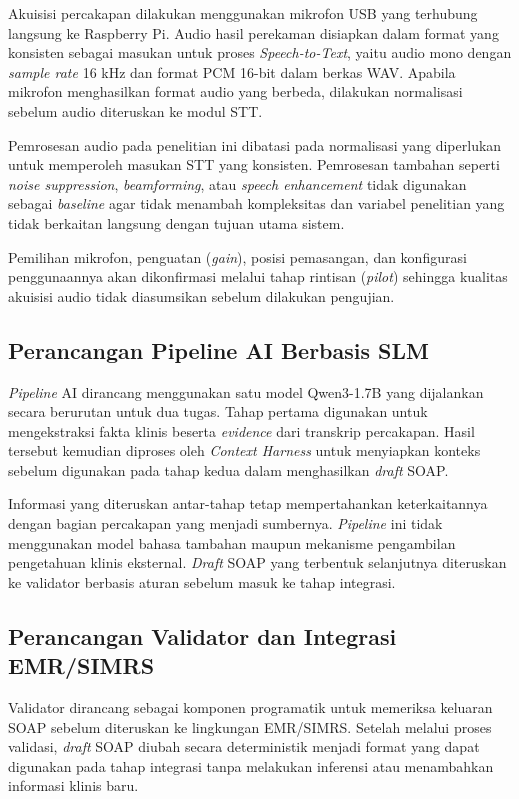 Akuisisi percakapan dilakukan menggunakan mikrofon USB yang terhubung langsung ke Raspberry Pi. Audio hasil perekaman disiapkan dalam format yang konsisten sebagai masukan untuk proses \emph{Speech-to-Text}, yaitu audio mono dengan \emph{sample rate} 16 kHz dan format PCM 16-bit dalam berkas WAV. Apabila mikrofon menghasilkan format audio yang berbeda, dilakukan normalisasi sebelum audio diteruskan ke modul STT.

Pemrosesan audio pada penelitian ini dibatasi pada normalisasi yang diperlukan untuk memperoleh masukan STT yang konsisten. Pemrosesan tambahan seperti \emph{noise suppression}, \emph{beamforming}, atau \emph{speech enhancement} tidak digunakan sebagai \emph{baseline} agar tidak menambah kompleksitas dan variabel penelitian yang tidak berkaitan langsung dengan tujuan utama sistem.

Pemilihan mikrofon, penguatan (\emph{gain}), posisi pemasangan, dan konfigurasi penggunaannya akan dikonfirmasi melalui tahap rintisan (\emph{pilot}) sehingga kualitas akuisisi audio tidak diasumsikan sebelum dilakukan pengujian.

\subsection{Perancangan Pipeline AI Berbasis SLM}
\label{subsec:pipelineai}

\emph{Pipeline} AI dirancang menggunakan satu model Qwen3-1.7B yang dijalankan secara berurutan untuk dua tugas. Tahap pertama digunakan untuk mengekstraksi fakta klinis beserta \emph{evidence} dari transkrip percakapan. Hasil tersebut kemudian diproses oleh \emph{Context Harness} untuk menyiapkan konteks sebelum digunakan pada tahap kedua dalam menghasilkan \emph{draft} SOAP.

Informasi yang diteruskan antar-tahap tetap mempertahankan keterkaitannya dengan bagian percakapan yang menjadi sumbernya. \emph{Pipeline} ini tidak menggunakan model bahasa tambahan maupun mekanisme pengambilan pengetahuan klinis eksternal. \emph{Draft} SOAP yang terbentuk selanjutnya diteruskan ke validator berbasis aturan sebelum masuk ke tahap integrasi.

\subsection{Perancangan Validator dan Integrasi EMR/SIMRS}
\label{subsec:perancanganvalidator}

Validator dirancang sebagai komponen programatik untuk memeriksa keluaran SOAP sebelum diteruskan ke lingkungan EMR/SIMRS. Setelah melalui proses validasi, \emph{draft} SOAP diubah secara deterministik menjadi format yang dapat digunakan pada tahap integrasi tanpa melakukan inferensi atau menambahkan informasi klinis baru.

